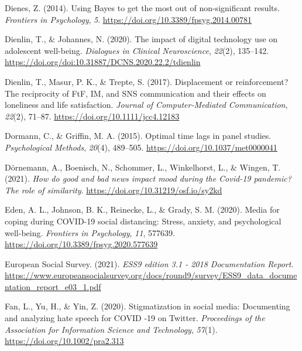 \documentclass[
  man,floatsintext]{apa7}
\newlength{\cslhangindent}
\newlength{\cslentryspacingunit} %
\newenvironment{CSLReferences}[2] %
 {%
  \setlength{\parindent}{0pt}
  \ifodd #1
  \let\oldpar\par
  \def\par{\hangindent=\cslhangindent\oldpar}
  \fi
  \setlength{\parskip}{#2\cslentryspacingunit}
 }%
 {}
\begin{document}
\begin{CSLReferences}{1}{0}
\leavevmode{}%
Dienes, Z. (2014). Using {Bayes} to get the most out of non-significant results. \emph{Frontiers in Psychology}, \emph{5}. \url{https://doi.org/10.3389/fpsyg.2014.00781}

\leavevmode{}%
Dienlin, T., \& Johannes, N. (2020). The impact of digital technology use on adolescent well-being. \emph{Dialogues in Clinical Neuroscience}, \emph{22}(2), 135--142. \url{https://doi.org/doi:10.31887/DCNS.2020.22.2/tdienlin}

\leavevmode{}%
Dienlin, T., Masur, P. K., \& Trepte, S. (2017). Displacement or reinforcement? {The} reciprocity of {FtF}, {IM}, and {SNS} communication and their effects on loneliness and life satisfaction. \emph{Journal of Computer-Mediated Communication}, \emph{22}(2), 71--87. \url{https://doi.org/10.1111/jcc4.12183}

\leavevmode{}%
Dormann, C., \& Griffin, M. A. (2015). Optimal time lags in panel studies. \emph{Psychological Methods}, \emph{20}(4), 489--505. \url{https://doi.org/10.1037/met0000041}

\leavevmode{}%
Dörnemann, A., Boenisch, N., Schommer, L., Winkelhorst, L., \& Wingen, T. (2021). \emph{How do good and bad news impact mood during the {Covid-19} pandemic? {The} role of similarity}. \url{https://doi.org/10.31219/osf.io/sy2kd}

\leavevmode{}%
Eden, A. L., Johnson, B. K., Reinecke, L., \& Grady, S. M. (2020). Media for coping during {COVID-19} social distancing: {Stress}, anxiety, and psychological well-being. \emph{Frontiers in Psychology}, \emph{11}, 577639. \url{https://doi.org/10.3389/fpsyg.2020.577639}

\leavevmode{}%
European Social Survey. (2021). \emph{{ESS9} edition 3.1 - 2018 {Documentation Report}}. \url{https://www.europeansocialsurvey.org/docs/round9/survey/ESS9_data_documentation_report_e03_1.pdf}

\leavevmode{}%
Fan, L., Yu, H., \& Yin, Z. (2020). Stigmatization in social media: {Documenting} and analyzing hate speech for {\textsc{COVID}} ‐19 on {Twitter}. \emph{Proceedings of the Association for Information Science and Technology}, \emph{57}(1). \url{https://doi.org/10.1002/pra2.313}


\end{CSLReferences}
\end{document}

